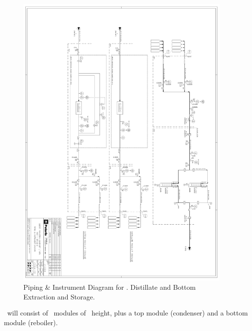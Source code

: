 \begin{figure}[!t]
\centering
\includegraphics[width=0.95\textwidth]{./Figures/Aria_Seruci0_extraction_PID.pdf}
\caption[P\& ID of \Aria (III9]{Piping \& Instrument Diagram for \SeruciZero. Distillate and Bottom Extraction and Storage.}
\label{fig:Aria-Column-PandID3}
\end{figure}

\SeruciOne\ will consist of \AriaCentralModulesNumber\ modules of \AriaCentralModulesHeight\ height, plus a top module (condenser) and a bottom module (reboiler).

